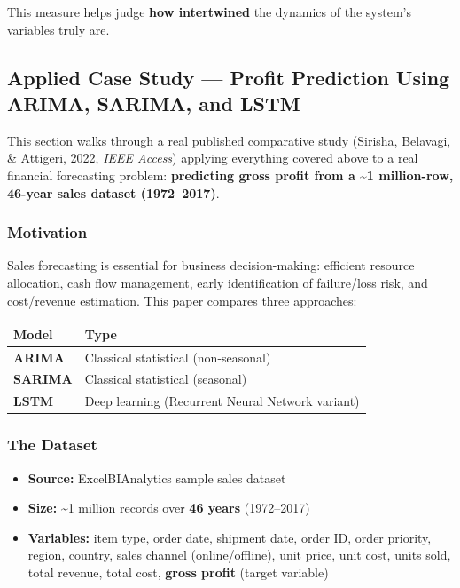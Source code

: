\documentclass[12pt,openany]{book}
\begin{document}
This measure helps judge \textbf{how intertwined} the dynamics of the system's variables truly are.

\subsection{Applied Case Study --- Profit Prediction Using ARIMA, SARIMA, and LSTM}

This section walks through a real published comparative study (Sirisha, Belavagi, \& Attigeri, 2022, \textit{IEEE Access}) applying everything covered above to a real financial forecasting problem: \textbf{predicting gross profit from a \textasciitilde{}1 million-row, 46-year sales dataset (1972--2017)}.

\subsubsection{Motivation}

Sales forecasting is essential for business decision-making: efficient resource allocation, cash flow management, early identification of failure/loss risk, and cost/revenue estimation. This paper compares three approaches:

\begin{center}
\begin{tabular}{|L{0.28\textwidth}|L{0.62\textwidth}|}
\hline
Model & Type \\
\hline
\textbf{ARIMA} & Classical statistical (non-seasonal) \\
\hline
\textbf{SARIMA} & Classical statistical (seasonal) \\
\hline
\textbf{LSTM} & Deep learning (Recurrent Neural Network variant) \\
\hline
\end{tabular}
\end{center}

\subsubsection{The Dataset}

\begin{itemize}[leftmargin=*]
    \item \textbf{Source:} ExcelBIAnalytics sample sales dataset
    \item \textbf{Size:} \textasciitilde{}1 million records over \textbf{46 years} (1972--2017)
    \item \textbf{Variables:} item type, order date, shipment date, order ID, order priority, region, country, sales channel (online/offline), unit price, unit cost, units sold, total revenue, total cost, \textbf{gross profit} (target variable)
\end{itemize}
\end{document}
